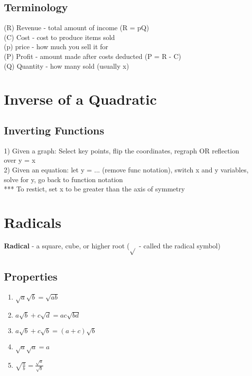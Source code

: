 \documentclass{article}
\begin{document}
\subsection*{Terminology}
(R) Revenue - total amount of income (R = pQ)\\
(C) Cost - cost to produce items sold \\
(p) price - how much you sell it for \\
(P) Profit - amount made after costs deducted (P = R - C)\\
(Q) Quantity - how many sold (usually x)\\



\section{Inverse of a Quadratic}

\subsection*{Inverting Functions}
1) Given a graph: Select key points, flip the coordinates, regraph OR reflection over y = x\\
2) Given an equation: let y = ... (remove func notation), switch x and y variables, solve for y, go back to function notation\\

*** To restict, set x to be greater than the axis of symmetry \\



\section{Radicals}

\textbf{Radical} - a square, cube, or higher root ($\sqrt{}$ - called the radical symbol)

\subsection*{Properties}
\noindent
\begin{enumerate}
    \item $\sqrt{a}\sqrt{b} = \sqrt{ab}$
    \item $a\sqrt{b} + c\sqrt{d} = ac\sqrt{bd}$
    \item $a\sqrt{b} + c\sqrt{b} = (a+c)\sqrt{b}$
    \item $\sqrt{a}\sqrt{a} = a$
    \item $\sqrt{\frac{a}{b}} = \frac{\sqrt{a}}{\sqrt{b}}$
\end{enumerate}
\end{document}
